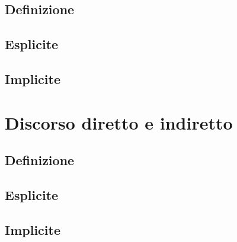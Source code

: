 \documentclass[a4paper,twoside,11pt,chapterprefix=false,bibliography=totocnumbered,listof=flat]{scrbook}
\begin{document}
\hypertarget{definizione-4}{%
\section{Definizione}\label{definizione-4}}

\hypertarget{esplicite-6}{%
\section{Esplicite}\label{esplicite-6}}

\hypertarget{implicite-6}{%
\section{Implicite}\label{implicite-6}}

\hypertarget{discorso-diretto-e-indiretto}{%
\chapter{Discorso diretto e indiretto}\label{discorso-diretto-e-indiretto}}

\hypertarget{definizione-5}{%
\section{Definizione}\label{definizione-5}}

\hypertarget{esplicite-7}{%
\section{Esplicite}\label{esplicite-7}}

\hypertarget{implicite-7}{%
\section{Implicite}\label{implicite-7}}


\end{document}
